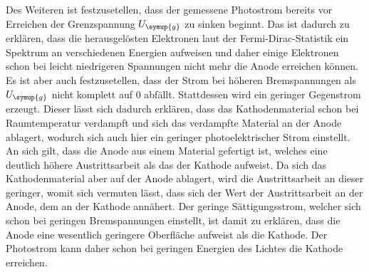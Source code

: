Des Weiteren ist festzusetellen, dass der gemessene Photostrom bereits vor Erreichen der Grenzspannung $U_{\symup{g}}$ zu sinken beginnt.
Das ist dadurch zu erklären, dass die herausgelösten Elektronen laut der Fermi-Dirac-Statistik ein Spektrum an verschiedenen Energien aufweisen 
und daher einige Elektronen schon bei leicht niedrigeren Spannungen nicht mehr die Anode erreichen können. 
Es ist aber auch festzusetellen, dass der Strom bei höheren Bremspannungen als $U_{\symup{g}}$ nicht komplett auf 0 abfällt. Stattdessen 
wird ein geringer Gegenstrom erzeugt. Dieser lässt sich dadurch erklären, dass das Kathodenmaterial schon bei Raumtemperatur verdampft und
sich das verdampfte Material an der Anode ablagert, wodurch sich auch hier ein geringer photoelektrischer Strom einstellt. An sich gilt, dass
die Anode aus einem Material gefertigt ist, welches eine deutlich höhere Austrittsarbeit als das der Kathode aufweist. Da sich das Kathodenmaterial
aber auf der Anode ablagert, wird die Austrittsarbeit an dieser geringer, womit sich vermuten lässt, dass sich der Wert der Austrittsarbeit
an der Anode, dem an der Kathode annähert. Der geringe Sättigungsstrom, welcher sich schon bei geringen Bremspannungen einstellt,
ist damit zu erklären, dass die Anode eine wesentlich geringere Oberfläche aufweist als die Kathode. Der Photostrom kann daher schon bei 
geringen Energien des Lichtes die Kathode erreichen.